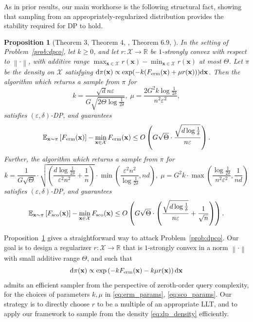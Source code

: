 \documentclass[11pt]{article}
\newtheorem{proposition}{Proposition}
\newcommand{\norm}[1]{\left\lVert#1\right\rVert}
\newcommand{\eps}{\epsilon}
\newcommand{\xset}{\mathcal{X}}
\newcommand{\R}{\mathbb{R}}
\newcommand{\E}{\mathbb{E}}
\newcommand{\dd}{\textup{d}}
\newcommand{\Par}[1]{\left(#1\right)}
\newcommand{\Brack}[1]{\left[#1\right]}
\newcommand{\0}{\mathbf{0}}
\newcommand{\1}{\mathbf{1}}
\newcommand{\vx}{\mathbf{x}}
\newcommand{\calX}{\mathcal{X}}
\newcommand{\Ferm}{F_{\textup{erm}}}
\newcommand{\Fpop}{F_{\textup{sco}}}
\renewcommand{\epsilon}{\varepsilon}
\begin{document}
As in prior results, our main workhorse is the following structural fact, showing that sampling from an appropriately-regularized distribution provides the stability required for DP to hold.

\begin{proposition}[Theorem 3, Theorem 4, \cite{GopiLLST23a}, Theorem 6.9, \cite{GopLL22}]\label{prop:gennormdp}
In the setting of Problem~\ref{prob:dpco}, let $k \ge 0$, and let $r: \xset \to \R$ be $1$-strongly convex with respect to $\norm{\cdot}$, with additive range $\max_{\vx \in \xset} r(\vx) - \min_{\vx \in \xset} r(\vx)$ at most $\Theta$. Let $\pi$ be the density on $\xset$ satisfying $\dd \pi(\vx) \propto \exp(-k(\Ferm(\vx) + \mu r(\vx))) \dd \vx$. Then the algorithm which returns a sample from $\pi$ for
\begin{equation}\label{eq:erm_params}k =\frac{\sqrt d n\eps}{G\sqrt{2\Theta \log \frac 1 {2\delta}}},\;  \mu = \frac{2G^2k\log \frac 1 {2\delta}}{n^2\eps^2},\end{equation}
satisfies $(\eps, \delta)$-DP, and guarantees
\begin{align*}
\E_{\vx \sim \pi}\Brack{\Ferm(\vx)} - \min_{\vx \in \xset}\Ferm(\vx) \le O\Par{G\sqrt{\Theta} \cdot \frac{\sqrt{d \log \frac 1 \delta}}{n\eps}}.
\end{align*}
Further, the algorithm which returns a sample from $\pi$ for
\begin{equation}\label{eq:sco_params}k = \frac{1}{G\sqrt{\Theta}} \cdot \sqrt{\Par{\frac{d\log \frac 1 {2\delta}}{\eps^2 n^2} + \frac{1}{n}}} \cdot \min\Par{\frac{\eps^2 n^2}{\log \frac 1 {2\delta}}, nd},\; \mu = G^2 k \cdot \max\Par{\frac{\log \frac 1 {2\delta}}{n^2\eps^2}, \frac{1}{nd}}\end{equation}
satisfies $(\eps, \delta)$-DP, and guarantees
\[\E_{\vx \sim \pi}\Brack{\Fpop(\vx)} - \min_{\vx \in \xset}\Fpop(\vx) \le O\Par{G\sqrt{\Theta} \cdot \Par{\frac{\sqrt{d\log \frac 1 \delta}}{n\eps} + \frac 1 {\sqrt n}}}.\]
\end{proposition}

Proposition~\ref{prop:gennormdp} gives a straightforward way to attack Problem~\ref{prob:dpco}. Our goal is to design a regularizer $r: \calX \to \R$ that is $1$-strongly convex in a norm $\norm{\cdot}$ with small additive range $\Theta$, and such that
\begin{equation}\label{eq:dp_density}\dd\pi(\vx) \propto \exp\Par{-k\Ferm(\vx) - k\mu r(\vx)}\dd \vx\end{equation}
admits an efficient sampler from the perspective of zeroth-order query complexity, for the choices of parameters $k, \mu$ in \eqref{eq:erm_params}, \eqref{eq:sco_params}. Our strategy is to directly choose $r$ to be a multiple of an appropriate LLT, and to apply our framework to sample from the density \eqref{eq:dp_density} efficiently.
\end{document}
